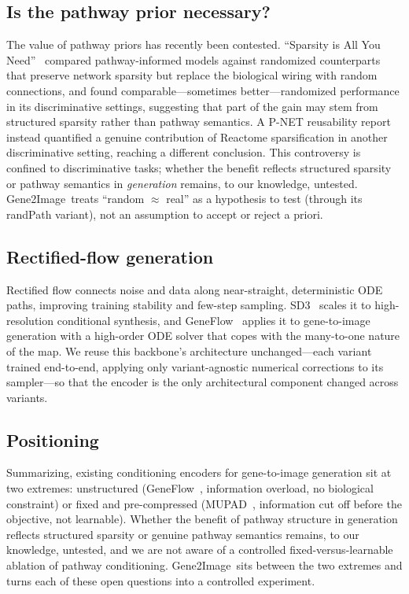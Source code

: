 \documentclass[journal]{IEEEtran}
\newcommand{\method}{Gene2Image}
\begin{document}
\subsection{Is the pathway prior necessary?}
The value of pathway priors has recently been contested. ``Sparsity is All You
Need''~\cite{sparsity} compared pathway-informed models against randomized
counterparts that preserve network sparsity but replace the biological wiring
with random connections, and found comparable---sometimes better---randomized
performance in its discriminative settings, suggesting that part of the gain may
stem from structured sparsity rather than pathway semantics. A P-NET reusability report~\cite{pnet_repro}
instead quantified a genuine contribution of Reactome sparsification in another
discriminative setting, reaching a different conclusion. This controversy is confined to discriminative tasks;
whether the benefit reflects structured sparsity or pathway semantics in
\emph{generation} remains, to our knowledge, untested.
\method\ treats ``random $\approx$ real'' as a hypothesis to test (through its
randPath variant), not an assumption to accept or reject a priori.

\subsection{Rectified-flow generation}
Rectified flow connects noise and data along near-straight, deterministic ODE
paths, improving training stability and few-step sampling. SD3~\cite{sd3} scales
it to high-resolution conditional synthesis, and GeneFlow~\cite{geneflow} applies
it to gene-to-image generation with a high-order ODE solver that copes with the
many-to-one nature of the map. We reuse this backbone's architecture
unchanged---each variant trained end-to-end, applying only variant-agnostic
numerical corrections to its sampler---so that the encoder is the only
architectural component changed across variants.

\subsection{Positioning}
Summarizing, existing conditioning encoders for gene-to-image generation sit
at two extremes: unstructured (GeneFlow~\cite{geneflow}, information overload, no
biological constraint) or fixed and pre-compressed (MUPAD~\cite{mupad}, information cut
off before the objective, not learnable). Whether the benefit of pathway structure
in generation reflects structured sparsity or genuine pathway semantics remains, to
our knowledge, untested, and
we are not aware of a controlled fixed-versus-learnable ablation of pathway
conditioning. \method\ sits between the two
extremes and turns each of these open questions into a controlled experiment.
\end{document}
